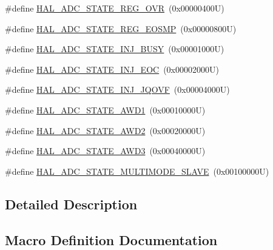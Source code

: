 \begin{DoxyCompactItemize}
\#define \hyperlink{group___a_d_c___exported___types_ga1f99cd51b6636d9f60bc68dacb01eb10}{H\+A\+L\+\_\+\+A\+D\+C\+\_\+\+S\+T\+A\+T\+E\+\_\+\+R\+E\+G\+\_\+\+O\+VR}~(0x00000400\+U)
\item 
\#define \hyperlink{group___a_d_c___exported___types_ga28309e91f810694b13b5035f4ff698ce}{H\+A\+L\+\_\+\+A\+D\+C\+\_\+\+S\+T\+A\+T\+E\+\_\+\+R\+E\+G\+\_\+\+E\+O\+S\+MP}~(0x00000800\+U)
\item 
\#define \hyperlink{group___a_d_c___exported___types_ga0044d240de80a70923b5c970d19ba24b}{H\+A\+L\+\_\+\+A\+D\+C\+\_\+\+S\+T\+A\+T\+E\+\_\+\+I\+N\+J\+\_\+\+B\+U\+SY}~(0x00001000\+U)
\item 
\#define \hyperlink{group___a_d_c___exported___types_gafcfffd11ab8b84d3b0a1ce50ccf821d5}{H\+A\+L\+\_\+\+A\+D\+C\+\_\+\+S\+T\+A\+T\+E\+\_\+\+I\+N\+J\+\_\+\+E\+OC}~(0x00002000\+U)
\item 
\#define \hyperlink{group___a_d_c___exported___types_ga0e29888675cbdd18e461fcd7711a2ad4}{H\+A\+L\+\_\+\+A\+D\+C\+\_\+\+S\+T\+A\+T\+E\+\_\+\+I\+N\+J\+\_\+\+J\+Q\+O\+VF}~(0x00004000\+U)
\item 
\#define \hyperlink{group___a_d_c___exported___types_ga39ce295171a5e608097017fda4cfd7d5}{H\+A\+L\+\_\+\+A\+D\+C\+\_\+\+S\+T\+A\+T\+E\+\_\+\+A\+W\+D1}~(0x00010000\+U)
\item 
\#define \hyperlink{group___a_d_c___exported___types_gae6e9712c706ca7f2998dfb5cf776b48f}{H\+A\+L\+\_\+\+A\+D\+C\+\_\+\+S\+T\+A\+T\+E\+\_\+\+A\+W\+D2}~(0x00020000\+U)
\item 
\#define \hyperlink{group___a_d_c___exported___types_gaa43e91fedb9ce41e36bc78ced4f3912e}{H\+A\+L\+\_\+\+A\+D\+C\+\_\+\+S\+T\+A\+T\+E\+\_\+\+A\+W\+D3}~(0x00040000\+U)
\item 
\#define \hyperlink{group___a_d_c___exported___types_ga24f867061abe6ee31227ec21289c69db}{H\+A\+L\+\_\+\+A\+D\+C\+\_\+\+S\+T\+A\+T\+E\+\_\+\+M\+U\+L\+T\+I\+M\+O\+D\+E\+\_\+\+S\+L\+A\+VE}~(0x00100000\+U)
\end{DoxyCompactItemize}


\subsection{Detailed Description}


\subsection{Macro Definition Documentation}
\mbox{\label{group___a_d_c___exported___types_ga39ce295171a5e608097017fda4cfd7d5}} 
